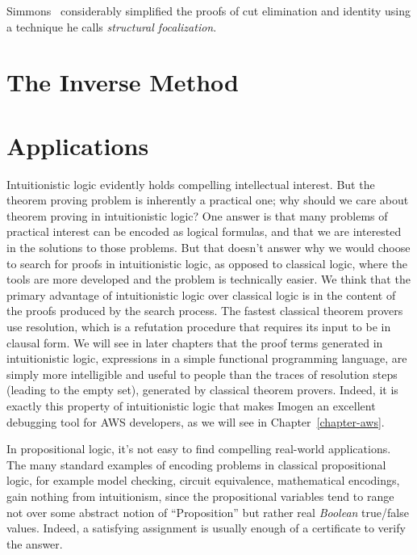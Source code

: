 Simmons~\cite{Simmons.2014.TOCL} considerably simplified the proofs of
cut elimination and identity using a technique he calls
\emph{structural focalization}.

\section{The Inverse Method}
\cite{Mints.1994.CP}

\section{Applications}

Intuitionistic logic evidently holds compelling intellectual interest.  But the
theorem proving problem is inherently a practical one; why should we care about
theorem proving in intuitionistic logic?  One answer is that many problems of
practical interest can be encoded as logical formulas, and that we are
interested in the solutions to those problems.  But that doesn't answer why we
would choose to search for proofs in intuitionistic logic, as opposed to
classical logic, where the tools are more developed and the problem is
technically easier.  We think that the primary advantage of intuitionistic logic
over classical logic is in the content of the proofs produced by the search
process.  The fastest classical theorem provers use resolution, which is a
refutation procedure that requires its input to be in clausal form.  We will see
in later chapters that the proof terms generated in intuitionistic logic,
expressions in a simple functional programming language, are simply more
intelligible and useful to people than the traces of resolution steps (leading
to the empty set), generated by classical theorem provers.  Indeed, it is
exactly this property of intuitionistic logic that makes Imogen an excellent
debugging tool for AWS developers, as we will see in Chapter~\ref{chapter-aws}.

In propositional logic, it's not easy to find compelling real-world
applications.  The many standard examples of encoding problems in classical propositional
logic, for example model checking, circuit equivalence, mathematical encodings,
gain nothing from intuitionism, since the propositional variables tend to range
not over some abstract notion of ``Proposition'' but rather real \emph{Boolean}
true/false values.  Indeed, a satisfying assignment is usually enough of a
certificate to verify the answer.

